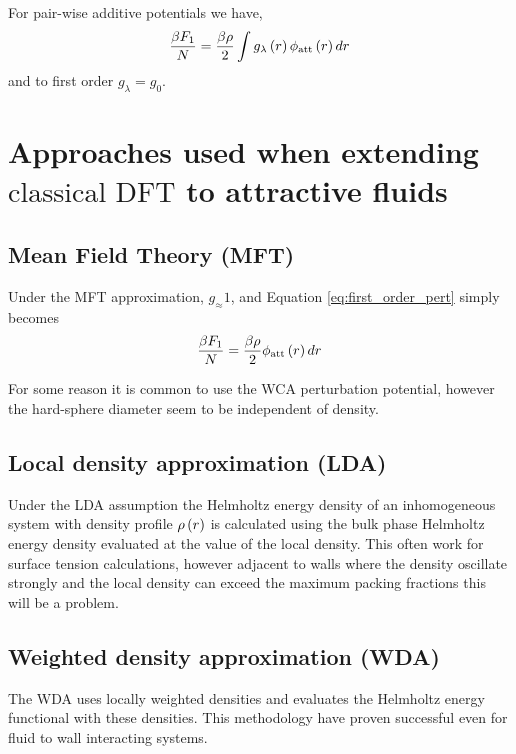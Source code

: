 \documentclass[12pt, letterpaper]{article}
\newcommand*{\lb}{\ensuremath{\left(}}
\newcommand*{\rb}{\ensuremath{\right)}}
\newcommand{\cdft}{\ensuremath{\text{classical DFT}}\xspace}
\newcommand{\attractive}{\ensuremath{\text{att}}\xspace}
\begin{document}
For pair-wise additive potentials we have,
\begin{equation}
  \label{eq:first_order_pert}
\frac{\beta F_1}{N} = \frac{\beta \rho}{2} \int  g_\lambda \lb r \rb \phi_\attractive \lb r \rb d r
\end{equation}
and to first order $g_\lambda = g_0$.

\section{Approaches used when extending \cdft to attractive fluids}

\subsection{Mean Field Theory (MFT)}
Under the MFT approximation, $g_ \approx 1$, and Equation
\eqref{eq:first_order_pert} simply becomes
\begin{equation}
  \label{eq:mft}
  \frac{\beta F_1}{N} = \frac{\beta \rho}{2} \phi_\attractive \lb r \rb d r
\end{equation}

For some reason it is common to use the WCA perturbation potential,
however the hard-sphere diameter seem to be independent of density.

\subsection{Local density approximation (LDA)}
Under the LDA assumption the Helmholtz energy density of an
inhomogeneous system with density profile $\rho \lb r\rb$ is
calculated using the bulk phase Helmholtz energy density evaluated at
the value of the local density. This often work for surface tension
calculations, however adjacent to walls where the density oscillate
strongly and the local density can exceed the maximum packing fractions
this will be a problem.

\subsection{Weighted density approximation (WDA)}
The WDA uses locally weighted densities and evaluates the Helmholtz
energy functional with these densities. This methodology have proven
successful even for fluid to wall interacting systems.

\citet{sauer2017}
\citet{tarazona1984, tarazona1984a}
\end{document}
